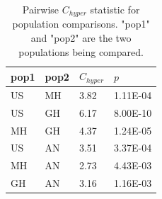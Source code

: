 \documentclass[9pt,twocolumn,twoside,lineno]{biorxiv}
\begin{document}
\begin{table}[h!]

\centering
\begin{tabular}{@{}llll@{}}
\toprule
pop1 & pop2 & $C_{hyper}$   & $p$  \\ \midrule
US   & MH   & 3.82 & 1.11E-04 \\
US   & GH   & 6.17 & 8.00E-10 \\
MH   & GH   & 4.37 & 1.24E-05 \\
US   & AN   & 3.51 & 3.37E-04 \\
MH   & AN   & 2.73 & 4.43E-03 \\
GH   & AN   & 3.16 & 1.16E-03 \\ \bottomrule
\end{tabular}
\label{tab:C_hyper}
\caption{Pairwise $C_{hyper}$ statistic for population comparisons. "pop1" and "pop2" are the two populations being compared.}
\end{table}

\clearpage
\end{document}
